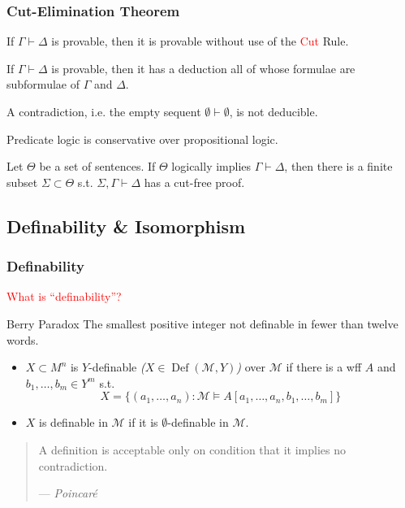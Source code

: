 \documentclass[UTF8,11pt,colorlinks,compress,openany]{beamer}%
\begin{document}
\begin{frame}\frametitle{Cut-Elimination Theorem}\vspace{-1ex}
	\begin{theorem}
		If $\Gamma\vdash\Delta$ is provable, then it is
		provable without use of the \textcolor{red}{Cut} Rule.
	\end{theorem}
\setlength\belowdisplayskip{0pt}
	\begin{corollary}
		If $\Gamma\vdash\Delta$ is provable, then it has a deduction all of whose formulae are subformulae of $\Gamma$ and $\Delta$.
	\end{corollary}
	\begin{corollary}[Consistency]
		A contradiction, i.e. the empty sequent $\emptyset\vdash\emptyset$, is not deducible.
	\end{corollary}
	\begin{corollary}[Conservation]
		Predicate logic is conservative over propositional logic.
	\end{corollary}
	\begin{theorem}
		Let $\Theta$ be a set of sentences. If $\Theta$ logically implies $\Gamma\vdash\Delta$, then there is a finite subset $\Sigma\subset\Theta$ s.t. $\Sigma,\Gamma\vdash\Delta$ has a cut-free proof.
	\end{theorem}
\end{frame}

\subsection{Definability \& Isomorphism}

\begin{frame}\frametitle{Definability}
\begin{block}{}
	\begin{center}
		\textcolor{red}{What is ``definability''?}
	\end{center}
\end{block}
\begin{block}{Berry Paradox}
	The smallest positive integer not definable in fewer than twelve words.
\end{block}
\begin{definition}[Definability]
\begin{itemize}
	\item $X\subset M^n$ is $Y$-definable \emph{($X\in\operatorname{Def}(\mathcal{M},Y)$)} over $\mathcal{M}$ if there is a wff $A$ and $b_1,\dots,b_m\in Y^m$ s.t.
	\[X=\big\{(a_1,\dots,a_n): \mathcal{M}\vDash A[a_1,\dots,a_n,b_1,\dots,b_m]\big\}\]
	\item $X$ is definable in $\mathcal{M}$ if it is $\emptyset$-definable in $\mathcal{M}$.
\end{itemize}
\end{definition}
\begin{quote}
	A definition is acceptable only on condition that it implies no contradiction.\par\hfill --- \textsl{Poincar\'e}
\end{quote}
\end{frame}
\end{document}
